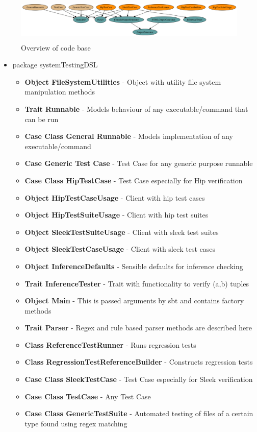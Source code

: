 \documentclass[12pt]{article}
\begin{document}
\begin{figure}[H]
  \centering
    \includegraphics[height=80px]{figures/scala_uml.png}
  \caption{Overview of code base}
\end{figure}
\begin{itemize}

\item package systemTestingDSL
    \begin{itemize}
        \item \textbf{Object FileSystemUtilities} - Object with utility file system manipulation methods
        \item \textbf{Trait Runnable} - Models behaviour of any executable/command that can be run
        \item \textbf{Case Class General Runnable} - Models implementation of any executable/command 
        \item \textbf{Case Generic Test Case} - Test Case for any generic purpose runnable
        \item \textbf{Case Class HipTestCase} - Test Case especially for Hip verification
        \item \textbf{Object HipTestCaseUsage} - Client with hip test cases
        \item \textbf{Object HipTestSuiteUsage} - Client with hip test suites
        \item \textbf{Object SleekTestSuiteUsage} - Client with sleek test suites
        \item \textbf{Object SleekTestCaseUsage} - Client with sleek test cases
        \item \textbf{Object InferenceDefaults} - Sensible defaults for inference checking
        \item \textbf{Trait InferenceTester} - Trait with functionality to verify (a,b) tuples
        \item \textbf{Object Main} - This is passed arguments by sbt and contains factory methods
        \item \textbf{Trait Parser} - Regex and rule based parser methods are described here
        \item \textbf{Class ReferenceTestRunner} - Runs regression tests
        \item \textbf{Class RegressionTestReferenceBuilder} - Constructs regression tests
        \item \textbf{Case Class SleekTestCase} - Test Case especially for Sleek verification
        \item \textbf{Case Class TestCase} - Any Test Case
        \item \textbf{Case Class GenericTestSuite} - Automated testing of files of a certain type found          using regex matching
        

\end{itemize}
\end{itemize}
\end{document}
